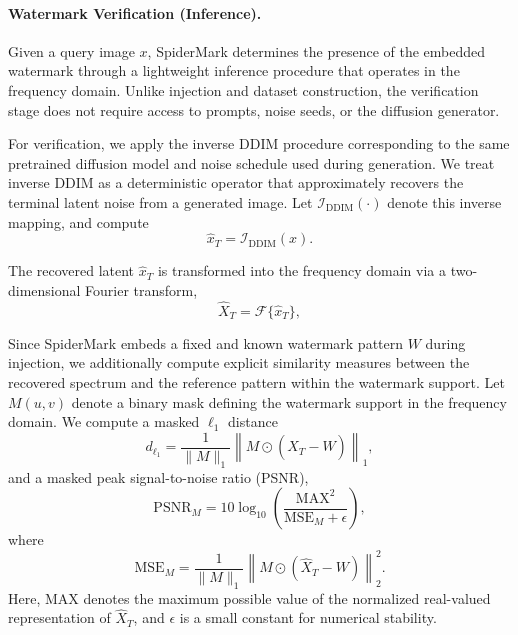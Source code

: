 {\color{blue}
\paragraph{Watermark Verification (Inference).}

Given a query image $x$, SpiderMark determines the presence of the embedded watermark through a lightweight inference procedure that operates in the frequency domain.
Unlike injection and dataset construction, the verification stage does not require access to prompts, noise seeds, or the diffusion generator.

For verification, we apply the inverse DDIM procedure corresponding to the same pretrained diffusion model and noise schedule used during generation.
We treat inverse DDIM as a deterministic operator that approximately recovers the terminal latent noise from a generated image.
Let $\mathcal{I}_{\text{DDIM}}(\cdot)$ denote this inverse mapping, and compute
\begin{equation}
    \hat{x}_T = \mathcal{I}_{\text{DDIM}}(x).
\end{equation}

The recovered latent $\hat{x}_T$ is transformed into the frequency domain via a two-dimensional Fourier transform,
\begin{equation}
    \hat{X}_T = \mathcal{F}\{\hat{x}_T\},
\end{equation}

Since SpiderMark embeds a fixed and known watermark pattern $W$ during injection, we additionally compute explicit similarity measures between the recovered spectrum and the reference pattern within the watermark support.
Let $M(u,v)$ denote a binary mask defining the watermark support in the frequency domain.
We compute a masked $\ell_1$ distance
\begin{equation}
    d_{\ell_1} = \frac{1}{\|M\|_1}\left\| M \odot \left(\hat{X}_T - W\right) \right\|_1,
\end{equation}
and a masked peak signal-to-noise ratio (PSNR),
\begin{equation}
    \mathrm{PSNR}_M = 10 \log_{10}\!\left( \frac{\mathrm{MAX}^2}{\mathrm{MSE}_M + \epsilon} \right),
\end{equation}
where
\begin{equation}
    \mathrm{MSE}_M = \frac{1}{\|M\|_1}\left\| M \odot \left(\hat{X}_T - W\right) \right\|_2^2.
\end{equation}
Here, $\mathrm{MAX}$ denotes the maximum possible value of the normalized real-valued representation of $\hat{X}_T$, and $\epsilon$ is a small constant for numerical stability.

}
